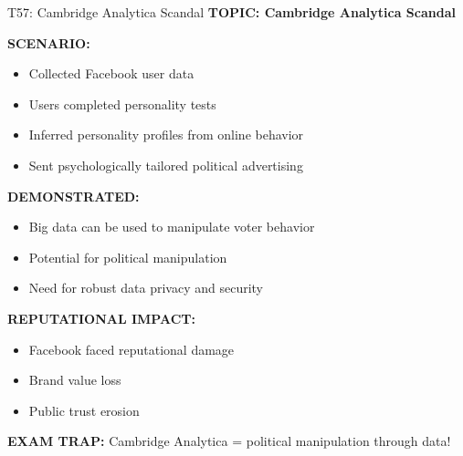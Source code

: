 \documentclass[8pt]{beamer}
\begin{document}
	\begin{frame}{T57: Cambridge Analytica Scandal}
		\fontsize{6.5}{7.5}\selectfont
		\textbf{TOPIC: Cambridge Analytica Scandal}
		
		\vspace{0.1cm}
		\textbf{SCENARIO:}
		\begin{itemize}
			\item Collected Facebook user data
			\item Users completed personality tests
			\item Inferred personality profiles from online behavior
			\item Sent psychologically tailored political advertising
		\end{itemize}
		
		\vspace{0.1cm}
		\textbf{DEMONSTRATED:}
		\begin{itemize}
			\item Big data can be used to manipulate voter behavior
			\item Potential for political manipulation
			\item Need for robust data privacy and security
		\end{itemize}
		
		\vspace{0.1cm}
		\textbf{REPUTATIONAL IMPACT:}
		\begin{itemize}
			\item Facebook faced reputational damage
			\item Brand value loss
			\item Public trust erosion
		\end{itemize}
		
		\textcolor{myred}{\textbf{EXAM TRAP:}} Cambridge Analytica = \textcolor{myblue}{political manipulation through data}!
	\end{frame}
	
\end{document}
